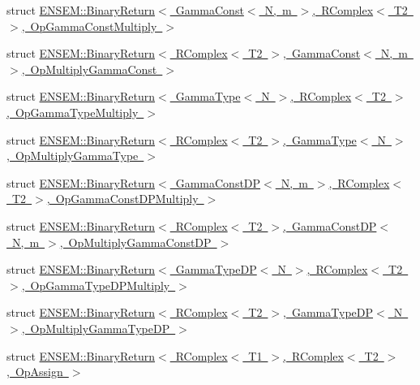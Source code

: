 \begin{DoxyCompactItemize}
struct \mbox{\hyperlink{structENSEM_1_1BinaryReturn_3_01GammaConst_3_01N_00_01m_01_4_00_01RComplex_3_01T2_01_4_00_01OpGammaConstMultiply_01_4}{E\+N\+S\+E\+M\+::\+Binary\+Return$<$ Gamma\+Const$<$ N, m $>$, R\+Complex$<$ T2 $>$, Op\+Gamma\+Const\+Multiply $>$}}
\item 
struct \mbox{\hyperlink{structENSEM_1_1BinaryReturn_3_01RComplex_3_01T2_01_4_00_01GammaConst_3_01N_00_01m_01_4_00_01OpMultiplyGammaConst_01_4}{E\+N\+S\+E\+M\+::\+Binary\+Return$<$ R\+Complex$<$ T2 $>$, Gamma\+Const$<$ N, m $>$, Op\+Multiply\+Gamma\+Const $>$}}
\item 
struct \mbox{\hyperlink{structENSEM_1_1BinaryReturn_3_01GammaType_3_01N_01_4_00_01RComplex_3_01T2_01_4_00_01OpGammaTypeMultiply_01_4}{E\+N\+S\+E\+M\+::\+Binary\+Return$<$ Gamma\+Type$<$ N $>$, R\+Complex$<$ T2 $>$, Op\+Gamma\+Type\+Multiply $>$}}
\item 
struct \mbox{\hyperlink{structENSEM_1_1BinaryReturn_3_01RComplex_3_01T2_01_4_00_01GammaType_3_01N_01_4_00_01OpMultiplyGammaType_01_4}{E\+N\+S\+E\+M\+::\+Binary\+Return$<$ R\+Complex$<$ T2 $>$, Gamma\+Type$<$ N $>$, Op\+Multiply\+Gamma\+Type $>$}}
\item 
struct \mbox{\hyperlink{structENSEM_1_1BinaryReturn_3_01GammaConstDP_3_01N_00_01m_01_4_00_01RComplex_3_01T2_01_4_00_01OpGammaConstDPMultiply_01_4}{E\+N\+S\+E\+M\+::\+Binary\+Return$<$ Gamma\+Const\+D\+P$<$ N, m $>$, R\+Complex$<$ T2 $>$, Op\+Gamma\+Const\+D\+P\+Multiply $>$}}
\item 
struct \mbox{\hyperlink{structENSEM_1_1BinaryReturn_3_01RComplex_3_01T2_01_4_00_01GammaConstDP_3_01N_00_01m_01_4_00_01OpMultiplyGammaConstDP_01_4}{E\+N\+S\+E\+M\+::\+Binary\+Return$<$ R\+Complex$<$ T2 $>$, Gamma\+Const\+D\+P$<$ N, m $>$, Op\+Multiply\+Gamma\+Const\+D\+P $>$}}
\item 
struct \mbox{\hyperlink{structENSEM_1_1BinaryReturn_3_01GammaTypeDP_3_01N_01_4_00_01RComplex_3_01T2_01_4_00_01OpGammaTypeDPMultiply_01_4}{E\+N\+S\+E\+M\+::\+Binary\+Return$<$ Gamma\+Type\+D\+P$<$ N $>$, R\+Complex$<$ T2 $>$, Op\+Gamma\+Type\+D\+P\+Multiply $>$}}
\item 
struct \mbox{\hyperlink{structENSEM_1_1BinaryReturn_3_01RComplex_3_01T2_01_4_00_01GammaTypeDP_3_01N_01_4_00_01OpMultiplyGammaTypeDP_01_4}{E\+N\+S\+E\+M\+::\+Binary\+Return$<$ R\+Complex$<$ T2 $>$, Gamma\+Type\+D\+P$<$ N $>$, Op\+Multiply\+Gamma\+Type\+D\+P $>$}}
\item 
struct \mbox{\hyperlink{structENSEM_1_1BinaryReturn_3_01RComplex_3_01T1_01_4_00_01RComplex_3_01T2_01_4_00_01OpAssign_01_4}{E\+N\+S\+E\+M\+::\+Binary\+Return$<$ R\+Complex$<$ T1 $>$, R\+Complex$<$ T2 $>$, Op\+Assign $>$}}

\end{DoxyCompactItemize}
